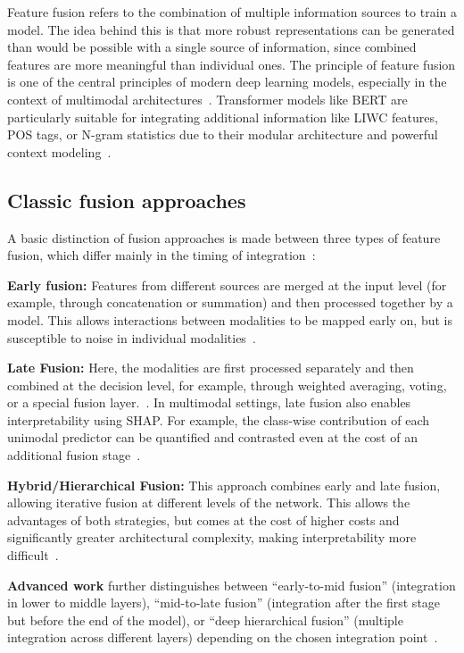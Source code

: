 Feature fusion refers to the combination of multiple information sources to train a model. The idea behind this is that more robust representations can be generated than would be possible with a single source of information, since combined features are more meaningful than individual ones. The principle of feature fusion is one of the central principles of modern deep learning models, especially in the context of multimodal architectures~\cite{li2024multimodal}. 
Transformer models like BERT are particularly suitable for integrating additional information like LIWC features, POS tags, or N-gram statistics due to their modular architecture and powerful context modeling~\cite{nagrani2021attention}.

\subsection{Classic fusion approaches}
A basic distinction of fusion approaches is made between three types of feature fusion, which differ mainly in the timing of integration~\cite{li2024multimodal, li2024fusionreview}:

\textbf{Early fusion:} Features from different sources are merged at the input level (for example, through concatenation or summation) and then processed together by a model. This allows interactions between modalities to be mapped early on, but is susceptible to noise in individual modalities~\cite{cai2025multimodal}.

\textbf{Late Fusion:} Here, the modalities are first processed separately and then combined at the decision level, for example, through weighted averaging, voting, or a special fusion layer.~\cite{sharma2023late}. In multimodal settings, late fusion also enables interpretability using SHAP. For example, the class-wise contribution of each unimodal predictor can be quantified and contrasted even at the cost of an additional fusion stage~\cite{abdul2024decoding}.

\textbf{Hybrid/Hierarchical Fusion:} This approach combines early and late fusion, allowing iterative fusion at different levels of the network. This allows the advantages of both strategies, but comes at the cost of higher costs and significantly greater architectural complexity, making interpretability more difficult~\cite{li2024multimodal}.

\textbf{Advanced work} further distinguishes between “early-to-mid fusion” (integration in lower to middle layers), “mid-to-late fusion” (integration after the first stage but before the end of the model), or “deep hierarchical fusion” (multiple integration across different layers) depending on the chosen integration point~\cite{li2024multimodal}.

